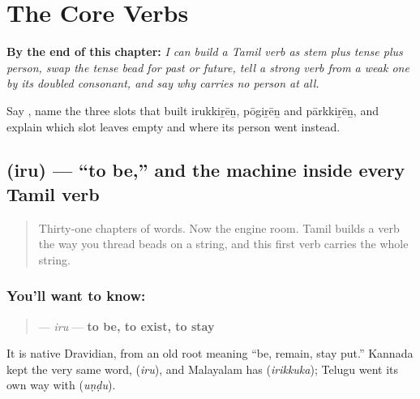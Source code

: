 
\chapter{The Core Verbs}
\label{ch:ta-core-verbs}

\begin{chapteropening}
\textbf{By the end of this chapter:} \emph{I can build a Tamil verb as stem plus tense plus person, swap the tense bead for past or future, tell a strong verb from a weak one by its doubled consonant, and say why  carries no person at all.}

Say   , name the three slots that built irukkiṟēṉ, pōgiṟēṉ and pārkkiṟēṉ, and explain which slot  leaves empty and where its person went instead.
\end{chapteropening}

\section[\texorpdfstring{\ta{இரு} (iru)}{இரு (iru)}]{ (iru) — \textquotedblleft{}to be,\textquotedblright{} and the machine inside every Tamil verb}

\label{lesson:TA-C32-iru}



\begin{quote}
Thirty-one chapters of words. Now the engine room. Tamil builds a verb the way you thread beads on a string, and this first verb carries the whole string.
\end{quote}

\subsection*{You'll want to know: }
\begin{quote}
\textbf{} — \emph{iru} — \textbf{to be, to exist, to stay}
\end{quote}

It is native Dravidian, from an old root meaning \textquotedblleft{}be, remain, stay put.\textquotedblright{} Kannada kept the very same word, \textbf{} (\emph{iru}), and Malayalam has \textbf{} (\emph{irikkuka}); Telugu went its own way with \textbf{} (\emph{uṇḍu}).

